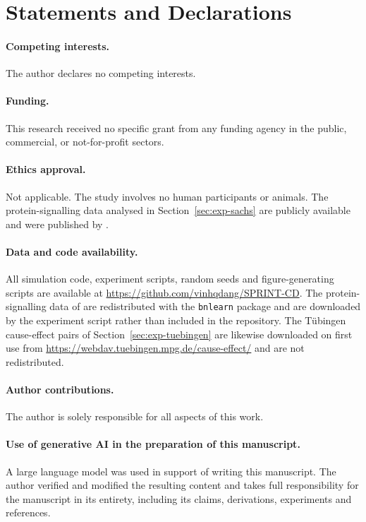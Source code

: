 \documentclass[pdflatex,sn-apa]{sn-jnl}
\theoremstyle{thmstyleone}%
\theoremstyle{thmstyletwo}%
\theoremstyle{thmstylethree}%
\begin{document}
\backmatter

\section*{Statements and Declarations}\label{sec:declarations}

\paragraph{Competing interests.} The author declares no competing interests.

\paragraph{Funding.} This research received no specific grant from any funding
agency in the public, commercial, or not-for-profit sectors.

\paragraph{Ethics approval.} Not applicable. The study involves no human
participants or animals. The protein-signalling data analysed in
Section~\ref{sec:exp-sachs} are publicly available and were published by
\citet{sachs2005causal}.

\paragraph{Data and code availability.}\label{sec:availability} All
simulation code, experiment scripts, random seeds and figure-generating
scripts are available at
\url{https://github.com/vinhqdang/SPRINT-CD}. The protein-signalling data of
\citet{sachs2005causal} are redistributed with the \texttt{bnlearn} package
\citep{scutari2010learning} and are downloaded by the experiment script rather
than included in the repository. The Tübingen cause-effect pairs of
Section~\ref{sec:exp-tuebingen} are likewise downloaded on first use from
\url{https://webdav.tuebingen.mpg.de/cause-effect/} and are not redistributed.

\paragraph{Author contributions.} The author is solely responsible for all
aspects of this work.

\paragraph{Use of generative AI in the preparation of this manuscript.} A
large language model was used in support of writing this manuscript. The
author verified and modified the resulting content and takes full
responsibility for the manuscript in its entirety, including its claims,
derivations, experiments and references.
\end{document}
